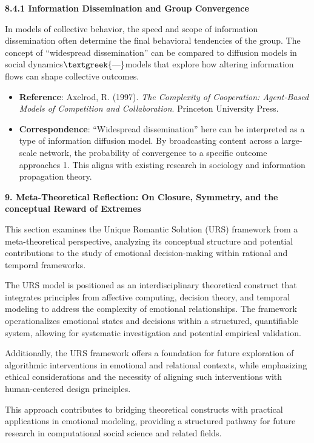 \documentclass[a4paper]{article}
\begin{document}
\textbf{8.4.1 Information Dissemination and Group Convergence}

In models of collective behavior, the speed and scope of information dissemination often determine the final behavioral
tendencies of the group. The concept of “widespread dissemination” can be compared to diffusion models in social
dynamics$\text{\textgreek{—}}$models that explore how altering information flows can shape collective outcomes.

\begin{itemize}[series=listWWNumxxvi,label=[F0B7?]]
\item \textbf{Reference}: Axelrod, R. (1997). \textit{The Complexity of Cooperation: Agent-Based Models of Competition
and Collaboration}. Princeton University Press.
\item \textbf{Correspondence}: “Widespread dissemination” here can be interpreted as a type of information diffusion
model. By broadcasting content across a large-scale network, the probability of convergence to a specific outcome
approaches 1. This aligns with existing research in sociology and information propagation theory.
\end{itemize}
{\centering\color[HTML]{595959}
\textbf{9. Meta-Theoretical Reflection: On Closure, Symmetry, and the conceptual Reward of Extremes}
\par}

This section examines the Unique Romantic Solution (URS) framework from a meta-theoretical perspective, analyzing its
conceptual structure and potential contributions to the study of emotional decision-making within rational and temporal
frameworks.

The URS model is positioned as an interdisciplinary theoretical construct that integrates principles from affective
computing, decision theory, and temporal modeling to address the complexity of emotional relationships. The framework
operationalizes emotional states\textbf{ }and decisions within a structured, quantifiable system, allowing for
systematic investigation and potential empirical validation.

Additionally, the URS framework offers a foundation for future exploration of algorithmic interventions in emotional and
relational contexts, while emphasizing ethical considerations and the necessity of aligning such interventions with
human-centered design principles.

This approach contributes to bridging theoretical constructs with practical applications in emotional modeling,
providing a structured pathway for future research in computational social science and related fields.
\end{document}
